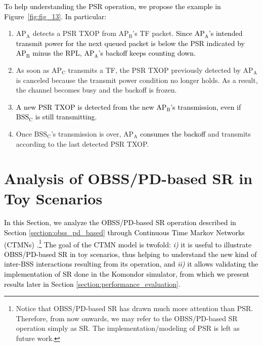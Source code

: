\documentclass[preprint,12pt]{elsarticle}
\theoremstyle{plain}
\begin{document}
\textcolor{black}{To help understanding the PSR operation, we propose the example in Figure~\ref{fig:fig_13}. In particular:}
\begin{enumerate}
	\item $\text{AP}_\text{A}$ detects a PSR TXOP from $\text{AP}_\text{B}$'s TF packet. \textcolor{black}{Since $\text{AP}_\text{A}$'s intended transmit power for the next queued packet is below the PSR indicated by $\text{AP}_\text{B}$ minus the RPL, $\text{AP}_\text{A}$'s backoff keeps counting down.}
	\item As soon as $\text{AP}_\text{C}$ transmits a TF, the PSR TXOP previously detected by $\text{AP}_\text{A}$ is canceled because the transmit power condition no longer holds. As a result, the channel becomes busy and the backoff is frozen.
	\item \textcolor{black}{A new PSR TXOP is detected  from the new $\text{AP}_\text{B}$'s transmission, even if $\text{BSS}_\text{C}$ is still transmitting.}
	\item Once $\text{BSS}_\text{C}$'s transmission is over, $\text{AP}_\text{A}$ \textcolor{black}{consumes the backoff} and transmits according to the last detected PSR TXOP.
\end{enumerate}

\section{Analysis of OBSS/PD-based SR in Toy Scenarios}
\label{section:analytical_model}

\textcolor{black}{In this Section, we analyze the OBSS/PD-based SR operation described in Section \ref{section:obss_pd_based} through Continuous Time Markov Networks (CTMNs) \cite{bellalta2014throughput, bellalta2016throughput,barrachina2019dynamic, barrachina2019overlap}.\footnote{Notice that OBSS/PD-based SR has drawn much more attention than PSR. Therefore, from now onwards, we may refer to the OBSS/PD-based SR operation simply as SR. The implementation/modeling of PSR is left as future work.} The goal of the CTMN model is twofold: \emph{i)} it is useful to illustrate OBSS/PD-based SR in toy scenarios, thus helping to understand the new kind of inter-BSS interactions resulting from its operation, and \emph{ii)} it allows validating the implementation of SR done in the Komondor simulator, from which we present results later in Section \ref{section:performance_evaluation}.}
\end{document}
